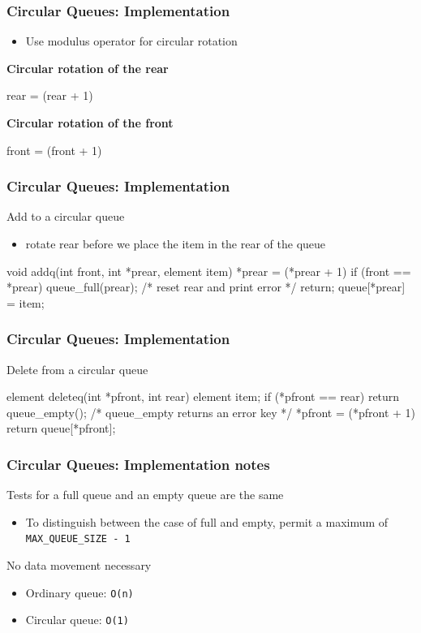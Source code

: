 \documentclass[newPxFont,sthlmFooter,nooffset]{beamer}
\begin{document}
\begin{frame}[t, fragile]
  \frametitle{Circular Queues: Implementation}
  \begin{itemize}
  \item Use modulus operator for circular rotation
  \end{itemize}
\bigskip
\textbf{Circular rotation of the rear}
\begin{codedef}
rear = (rear + 1) %
\end{codedef}

\textbf{Circular rotation of the front}
\begin{codedef}
front = (front + 1) %
\end{codedef}
\end{frame}

\begin{frame}[t, fragile]
  \frametitle{Circular Queues: Implementation}
Add to a circular queue
\begin{itemize}
\item rotate rear before we place the item in the rear of the queue
\end{itemize}

\begin{ncodedef}
void addq(int front, int *prear, element item){
    *prear = (*prear + 1)  %
    if (front == *prear) {
        queue_full(prear);
            /* reset rear and print error */
        return;
    }
    queue[*prear] = item;
}
\end{ncodedef}
\end{frame}

\begin{frame}[t, fragile]
  \frametitle{Circular Queues: Implementation}
Delete from a circular queue

\begin{ncodedef}
element deleteq(int *pfront, int rear){
    element item;
    if (*pfront == rear)
        return queue_empty();
        /* queue_empty returns an error key */
    *pfront = (*pfront + 1) %
    return queue[*pfront];
}
\end{ncodedef}
\end{frame}

\begin{frame}[t]
  \frametitle{Circular Queues: Implementation notes}
Tests for a full queue and an empty queue are the same
\begin{itemize}
\item To distinguish between the case of full and empty, permit a maximum of \texttt{MAX\_QUEUE\_SIZE - 1}
\end{itemize}
\bigskip
No data movement necessary
\begin{itemize}
\item Ordinary queue: \texttt{O(n)}
\item Circular queue: \texttt{O(1)}
\end{itemize}

\end{frame}
\end{document}
